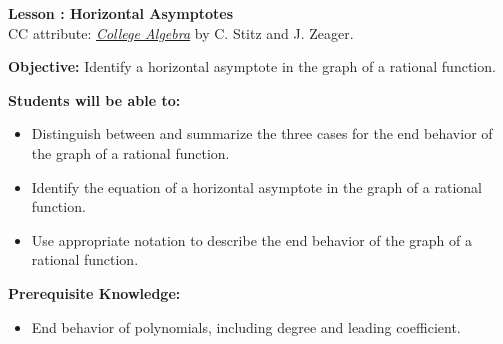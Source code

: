 \documentclass[12pt]{article}
\theoremstyle{definition}
\begin{document}
{\bf \large Lesson : Horizontal Asymptotes}\label{les:horizontal_asymptotes}
\\ CC attribute: \href{http://www.stitz-zeager.com}{\it{College Algebra}} by C. Stitz and J. Zeager. 
\hfill \doclicenseImage[imagewidth=5em]\\
\par
{\bf Objective:} Identify a horizontal asymptote in the graph of a rational function.\\
\par
{\bf Students will be able to:}
\begin{itemize}
	\item Distinguish between and summarize the three cases for the end behavior of the graph of a rational function. 
	\item Identify the equation of a horizontal asymptote in the graph of a rational function.
	\item Use appropriate notation to describe the end behavior of the graph of a rational function.
\end{itemize}
{\bf Prerequisite Knowledge:}
\begin{itemize}
	\item End behavior of polynomials, including degree and leading coefficient.
\end{itemize}
\hrulefill
\end{document}
